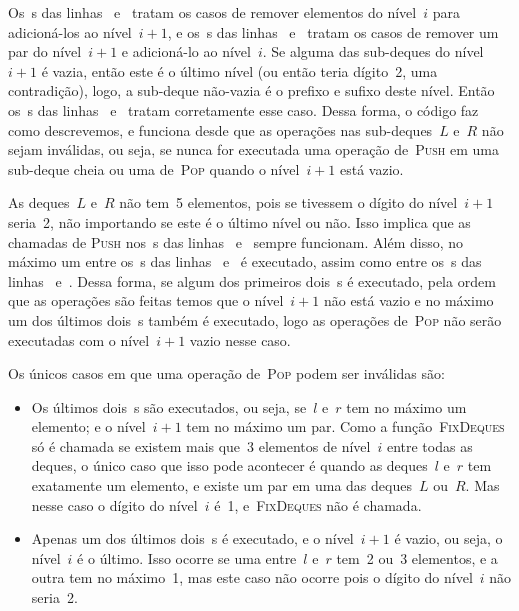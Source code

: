 \documentclass[main.tex]{subfiles}
\begin{document}
Os~s das linhas~ e~ tratam os casos de remover elementos do nível~$i$ para adicioná-los ao nível~$i+1$, e os~s das linhas~ e~ tratam os casos de remover um par do nível~$i+1$ e adicioná-lo ao nível~$i$. Se alguma das sub-deques do nível~$i+1$ é vazia, então este é o último nível (ou então teria dígito~2, uma contradição), logo, a sub-deque não-vazia é o prefixo e sufixo deste nível. Então os~s das linhas~ e~ tratam corretamente esse caso. Dessa forma, o código faz como descrevemos, e funciona desde que as operações nas sub-deques~$L$ e~$R$ não sejam inválidas, ou seja, se nunca for executada uma operação de~\textsc{Push} em uma sub-deque cheia ou uma de~\textsc{Pop} quando o nível~$i+1$ está vazio.

As deques~$L$ e~$R$ não tem~5 elementos, pois se tivessem o dígito do nível~$i+1$ seria~2, não importando se este é o último nível ou não. Isso implica que as chamadas de \textsc{Push} nos~s das linhas~ e~ sempre funcionam. Além disso, no máximo um entre os~s das linhas~ e~ é executado, assim como entre os~s das linhas~ e~. Dessa forma, se algum dos primeiros dois~s é executado, pela ordem que as operações são feitas temos que o nível~$i+1$ não está vazio e no máximo um dos últimos dois~s também é executado, logo as operações de~\textsc{Pop} não serão executadas com o nível~$i+1$ vazio nesse caso.

Os únicos casos em que uma operação de~\textsc{Pop} podem ser inválidas são:
\begin{itemize}
    \item Os últimos dois~s são executados, ou seja, se~$l$ e~$r$ tem no máximo um elemento; e o nível~$i+1$ tem no máximo um par. Como a função~\textsc{FixDeques} só é chamada se existem mais que~3 elementos de nível~$i$ entre todas as deques, o único caso que isso pode acontecer é quando as deques~$l$ e~$r$ tem exatamente um elemento, e existe um par em uma das deques~$L$ ou~$R$. Mas nesse caso o dígito do nível~$i$ é~1, e~\textsc{FixDeques} não é chamada.
    \item Apenas um dos últimos dois~s é executado, e o nível~$i+1$ é vazio, ou seja, o nível~$i$ é o último. Isso ocorre se uma entre~$l$ e~$r$ tem~2 ou~3 elementos, e a outra tem no máximo~1, mas este caso não ocorre pois o dígito do nível~$i$ não seria~2.
\end{itemize}
\end{document}
